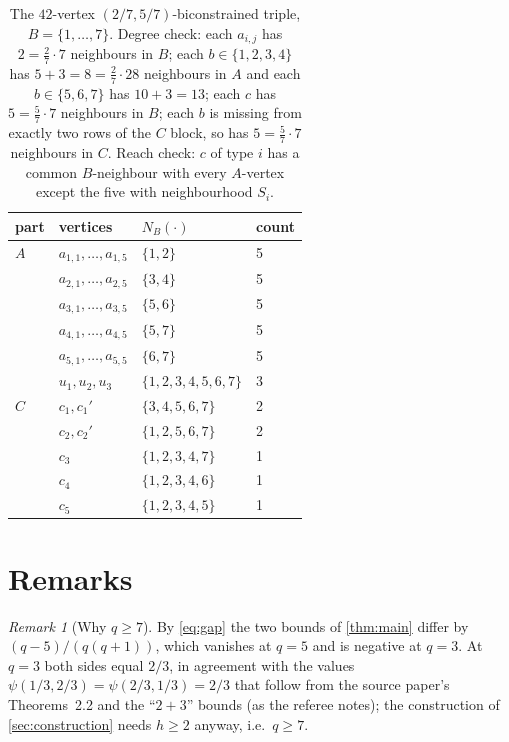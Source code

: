 \documentclass[11pt,a4paper]{article}
\theoremstyle{plain}
\theoremstyle{definition}
\theoremstyle{remark}
\newtheorem{remark}[theorem]{Remark}
\newcommand{\NB}{N_B}
\begin{document}
\begin{table}[ht]
\centering\small
\begin{tabular}{@{}llll@{}}
\toprule
part & vertices & $\NB(\cdot)$ & count\\
\midrule
$A$ & $a_{1,1},\dots,a_{1,5}$ & $\{1,2\}$ & 5\\
    & $a_{2,1},\dots,a_{2,5}$ & $\{3,4\}$ & 5\\
    & $a_{3,1},\dots,a_{3,5}$ & $\{5,6\}$ & 5\\
    & $a_{4,1},\dots,a_{4,5}$ & $\{5,7\}$ & 5\\
    & $a_{5,1},\dots,a_{5,5}$ & $\{6,7\}$ & 5\\
    & $u_1,u_2,u_3$ & $\{1,2,3,4,5,6,7\}$ & 3\\
\midrule
$C$ & $c_1,c_1'$ & $\{3,4,5,6,7\}$ & 2\\
    & $c_2,c_2'$ & $\{1,2,5,6,7\}$ & 2\\
    & $c_3$ & $\{1,2,3,4,7\}$ & 1\\
    & $c_4$ & $\{1,2,3,4,6\}$ & 1\\
    & $c_5$ & $\{1,2,3,4,5\}$ & 1\\
\bottomrule
\end{tabular}
\caption{The $42$-vertex $(2/7,5/7)$-biconstrained triple, $B=\{1,\dots,7\}$. Degree check: each $a_{i,j}$ has $2=\frac27\cdot7$ neighbours in $B$; each $b\in\{1,2,3,4\}$ has $5+3=8=\frac27\cdot28$ neighbours in $A$ and each $b\in\{5,6,7\}$ has $10+3=13$; each $c$ has $5=\frac57\cdot7$ neighbours in $B$; each $b$ is missing from exactly two rows of the $C$ block, so has $5=\frac57\cdot7$ neighbours in $C$. Reach check: $c$ of type $i$ has a common $B$-neighbour with every $A$-vertex except the five with neighbourhood $S_i$.}
\label{tab:cert}
\end{table}

\section{Remarks}\label{sec:remarks}

\begin{remark}[Why $q\ge7$]
By \eqref{eq:gap} the two bounds of \cref{thm:main} differ by $(q-5)/(q(q+1))$, which vanishes at $q=5$ and is negative at $q=3$. At $q=3$ both sides equal $2/3$, in agreement with the values $\psi(1/3,2/3)=\psi(2/3,1/3)=2/3$ that follow from the source paper's Theorems~2.2 and the ``$2+3$'' bounds (as the referee notes); the construction of \cref{sec:construction} needs $h\ge2$ anyway, i.e.\ $q\ge7$.
\end{remark}
\end{document}
